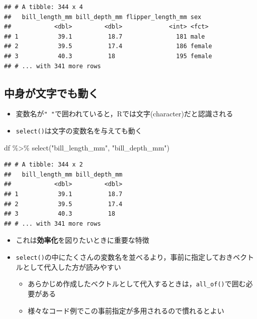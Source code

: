 \documentclass[
  xelatex,ja=standard, b5paper]{bxjsbook}
\newenvironment{Shaded}{\begin{snugshade}}{\end{snugshade}}
\newcommand{\FunctionTok}[1]{\textcolor[rgb]{0.00,0.00,0.00}{#1}}
\newcommand{\NormalTok}[1]{#1}
\newcommand{\SpecialCharTok}[1]{\textcolor[rgb]{0.00,0.00,0.00}{#1}}
\newcommand{\StringTok}[1]{\textcolor[rgb]{0.31,0.60,0.02}{#1}}
\providecommand{\tightlist}{%
  \setlength{\itemsep}{0pt}\setlength{\parskip}{0pt}}
\begin{document}
\begin{verbatim}
## # A tibble: 344 x 4
##   bill_length_mm bill_depth_mm flipper_length_mm sex   
##            <dbl>         <dbl>             <int> <fct> 
## 1           39.1          18.7               181 male  
## 2           39.5          17.4               186 female
## 3           40.3          18                 195 female
## # ... with 341 more rows
\end{verbatim}

\hypertarget{select-cha}{%
\subsection{中身が文字でも動く}\label{select-cha}}

\begin{itemize}
\tightlist
\item
  変数名が\texttt{"\ "}で囲われていると，Rでは文字(character)だと認識される
\item
  \texttt{select()}は文字の変数名を与えても動く
\end{itemize}

\begin{Shaded}
\begin{Highlighting}[]
\NormalTok{df }\SpecialCharTok{\%\textgreater{}\%} 
  \FunctionTok{select}\NormalTok{(}\StringTok{"bill\_length\_mm"}\NormalTok{, }\StringTok{"bill\_depth\_mm"}\NormalTok{)}
\end{Highlighting}
\end{Shaded}

\begin{verbatim}
## # A tibble: 344 x 2
##   bill_length_mm bill_depth_mm
##            <dbl>         <dbl>
## 1           39.1          18.7
## 2           39.5          17.4
## 3           40.3          18  
## # ... with 341 more rows
\end{verbatim}

\begin{itemize}
\tightlist
\item
  これは\textbf{効率化}を図りたいときに重要な特徴
\item
  \texttt{select()}の中にたくさんの変数名を並べるより，事前に指定しておきベクトルとして代入した方が読みやすい

  \begin{itemize}
  \tightlist
  \item
    あらかじめ作成したベクトルとして代入するときは，\texttt{all\_of()}で囲む必要がある
  \item
    様々なコード例でこの事前指定が多用されるので慣れるとよい
  \end{itemize}
\end{itemize}
\end{document}

